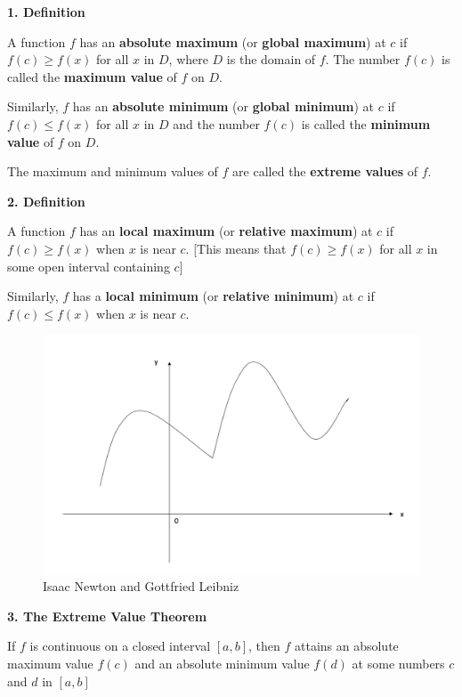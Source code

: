 \documentclass[]{book}
\begin{document}
\textbf{1. Definition}

A function \(f\) has an \textbf{absolute maximum} (or \textbf{global maximum}) at \(c\) if \(f(c)\geq f(x)\) for all \(x\) in \(D\), where \(D\) is the domain of \(f\). The number \(f(c)\) is called the \textbf{maximum value} of \(f\) on \(D\).

Similarly, \(f\) has an \textbf{absolute minimum} (or \textbf{global minimum}) at \(c\) if \(f(c)\leq f(x)\) for all \(x\) in \(D\) and the number \(f(c)\) is called the \textbf{minimum value} of \(f\) on \(D\).

The maximum and minimum values of \(f\) are called the \textbf{extreme values} of \(f\).

\textbf{2. Definition}

A function \(f\) has an \textbf{local maximum} (or \textbf{relative maximum}) at \(c\) if \(f(c)\geq f(x)\) when \(x\) is near \(c\).
{[}This means that \(f(c)\geq f(x)\) for all \(x\) in some open interval containing \(c\){]}

Similarly, \(f\) has a \textbf{local minimum} (or \textbf{relative minimum}) at \(c\) if \(f(c)\leq f(x)\) when \(x\) is near \(c\).

\begin{figure}

{\centering \includegraphics[width=1\linewidth]{figure/5Derivatives-14} 

}

\caption{Isaac Newton and Gottfried Leibniz}\label{fig:unnamed-chunk-13}
\end{figure}

\textbf{3. The Extreme Value Theorem}

If \(f\) is continuous on a closed interval \([a,b]\), then \(f\) attains an absolute maximum value \(f(c)\) and an absolute minimum value \(f(d)\) at some numbers \(c\) and \(d\) in \([a,b]\)
\end{document}
